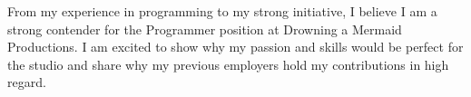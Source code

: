 \documentclass[11pt, a4paper]{awesome-cv}
\begin{document}
\begin{cvletter}
From my experience in programming to my strong initiative, I believe I am a strong contender for the Programmer position at Drowning a Mermaid Productions. I am excited to show why my passion and skills would be perfect for the studio and share why my previous employers hold my contributions in high regard.
\end{cvletter}


\makeletterclosing
\end{document}
